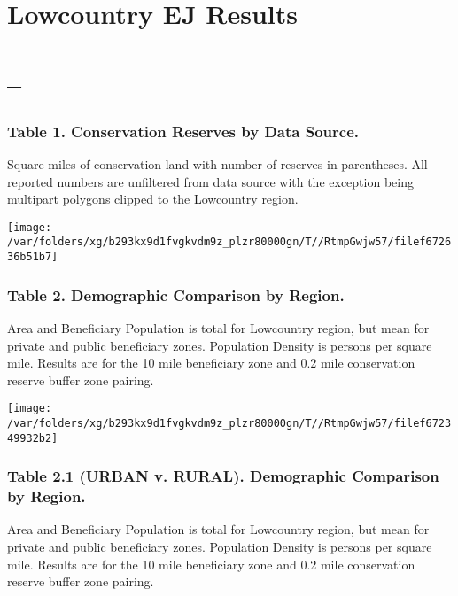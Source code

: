 \documentclass[landscape]{article}
\author{}
\date{\vspace{-2.5em}}
\begin{document}
\hypertarget{lowcountry-ej-results}{%
\section{Lowcountry EJ Results}\label{lowcountry-ej-results}}

\hypertarget{section}{%
\section{--}\label{section}}

\hypertarget{table-1.-conservation-reserves-by-data-source.}{%
\subsubsection{Table 1. Conservation Reserves by Data
Source.}\label{table-1.-conservation-reserves-by-data-source.}}

Square miles of conservation land with number of reserves in
parentheses. All reported numbers are unfiltered from data source with
the exception being multipart polygons clipped to the Lowcountry region.

\texttt{[image: /var/folders/xg/b293kx9d1fvgkvdm9z\_plzr80000gn/T//RtmpGwjw57/filef672636b51b7]}

\hypertarget{table-2.-demographic-comparison-by-region.}{%
\subsubsection{Table 2. Demographic Comparison by
Region.}\label{table-2.-demographic-comparison-by-region.}}

Area and Beneficiary Population is total for Lowcountry region, but mean
for private and public beneficiary zones. Population Density is persons
per square mile. Results are for the 10 mile beneficiary zone and 0.2
mile conservation reserve buffer zone pairing.

\texttt{[image: /var/folders/xg/b293kx9d1fvgkvdm9z\_plzr80000gn/T//RtmpGwjw57/filef672349932b2]}
\pagebreak

\hypertarget{table-2.1-urban-v.-rural.-demographic-comparison-by-region.}{%
\subsubsection{Table 2.1 (URBAN v. RURAL). Demographic Comparison by
Region.}\label{table-2.1-urban-v.-rural.-demographic-comparison-by-region.}}

Area and Beneficiary Population is total for Lowcountry region, but mean
for private and public beneficiary zones. Population Density is persons
per square mile. Results are for the 10 mile beneficiary zone and 0.2
mile conservation reserve buffer zone pairing.
\end{document}
